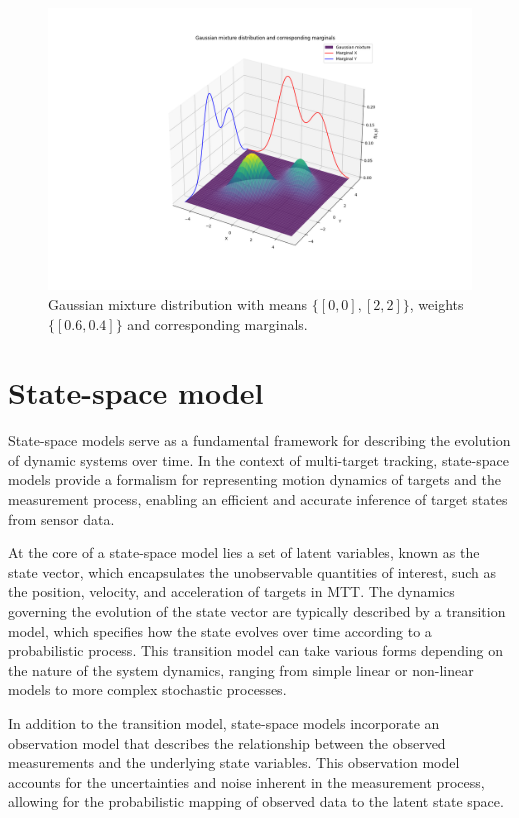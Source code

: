 \begin{figure}[htbp]
    \centering
    \includegraphics[width=1\textwidth]{text/chapter_01/imgs/gaussMix_with_marginals}
    \caption{Gaussian mixture distribution with means $\{[0,0], [2,2]\}$, weights $\{[0.6, 0.4]\}$ and corresponding marginals.}
    \label{fig:gaussMixWithMarginals}
\end{figure}

    \section{State-space model}
\label{sec:stateSpaceModel}
State-space models serve as a fundamental framework for describing the evolution of dynamic systems over time. In the context of multi-target tracking, state-space models provide a formalism for representing motion dynamics of targets and the measurement process, enabling an efficient and accurate inference of target states from sensor data.

At the core of a state-space model lies a set of latent variables, known as the state vector, which encapsulates the
unobservable quantities of interest, such as the position, velocity, and acceleration of targets in MTT. The dynamics governing the evolution of the state vector are typically described by a transition model, which specifies how the state evolves over time according to a probabilistic process. This transition model can take various forms depending on the nature of the system dynamics, ranging from simple linear or non-linear models to more complex stochastic processes.

In addition to the transition model, state-space models incorporate an observation model that describes the relationship between the observed measurements and the underlying state variables. This observation model accounts for the uncertainties and noise inherent in the measurement process, allowing for the probabilistic mapping of observed data to the latent state space.

